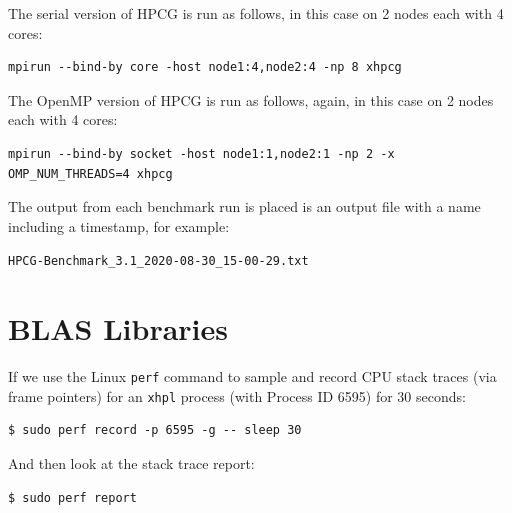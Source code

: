 \documentclass{report}
\begin{document}
The serial version of HPCG is run as follows, in this case on 2 nodes each with 4 cores:

\lstset{style=type}
\begin{lstlisting}
mpirun --bind-by core -host node1:4,node2:4 -np 8 xhpcg
\end{lstlisting}

The OpenMP version of HPCG is run as follows, again, in this case on 2 nodes each with 4 cores:

\lstset{style=type}
\begin{lstlisting}
mpirun --bind-by socket -host node1:1,node2:1 -np 2 -x OMP_NUM_THREADS=4 xhpcg
\end{lstlisting}

The output from each benchmark run is placed is an output file with a name including a timestamp, for example:

\verb|HPCG-Benchmark_3.1_2020-08-30_15-00-29.txt|


%
%
\section{BLAS Libraries}

If we use the Linux \verb|perf| command to sample and record CPU stack traces (via frame pointers) for an \verb|xhpl| process (with Process ID 6595) for 30 seconds:

\lstset{style=type}
\begin{lstlisting}
$ sudo perf record -p 6595 -g -- sleep 30
\end{lstlisting}

And then look at the stack trace report: 

\lstset{style=type}
\begin{lstlisting}
$ sudo perf report
\end{lstlisting}
\end{document}
